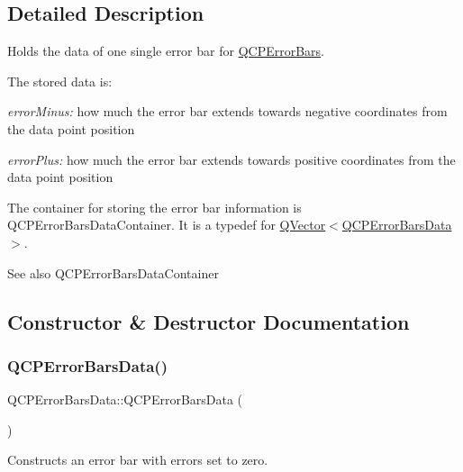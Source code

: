 \subsection{Detailed Description}
Holds the data of one single error bar for \hyperlink{class_q_c_p_error_bars}{Q\+C\+P\+Error\+Bars}. 

The stored data is\+: \begin{DoxyItemize}
\item {\itshape error\+Minus\+:} how much the error bar extends towards negative coordinates from the data point position \item {\itshape error\+Plus\+:} how much the error bar extends towards positive coordinates from the data point position\end{DoxyItemize}
The container for storing the error bar information is Q\+C\+P\+Error\+Bars\+Data\+Container. It is a typedef for {\ttfamily \hyperlink{class_q_vector}{Q\+Vector}$<$\hyperlink{class_q_c_p_error_bars_data}{Q\+C\+P\+Error\+Bars\+Data}$>$}.

\begin{DoxySeeAlso}{See also}
Q\+C\+P\+Error\+Bars\+Data\+Container 
\end{DoxySeeAlso}


\subsection{Constructor \& Destructor Documentation}
\mbox{\label{class_q_c_p_error_bars_data_ac18bdb46dec56f8df7f3c99d058cc725}} 
\subsubsection{\texorpdfstring{Q\+C\+P\+Error\+Bars\+Data()}{QCPErrorBarsData()}\hspace{0.1cm}{\footnotesize\ttfamily [1/3]}}
{\footnotesize\ttfamily Q\+C\+P\+Error\+Bars\+Data\+::\+Q\+C\+P\+Error\+Bars\+Data (\begin{DoxyParamCaption}{ }\end{DoxyParamCaption})}

Constructs an error bar with errors set to zero. \mbox{\label{class_q_c_p_error_bars_data_a73ebdaa55fa7f0052b70895b28edb444}} 
